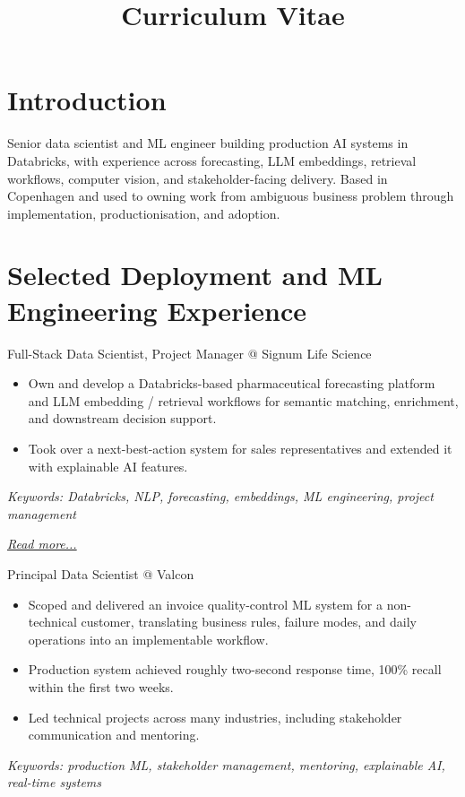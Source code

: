 \documentclass[11pt,a4paper]{moderncv}
\title{Curriculum Vitae}
\begin{document}
\makecvtitle

\section*{Introduction}
Senior data scientist and ML engineer building production AI systems in Databricks, with experience across forecasting, LLM embeddings, retrieval workflows, computer vision, and stakeholder-facing delivery. Based in Copenhagen and used to owning work from ambiguous business problem through implementation, productionisation, and adoption.

\section{Selected Deployment and ML Engineering Experience}

\large{Full-Stack Data Scientist, Project Manager @ Signum Life Science}
\normalsize
\begin{itemize}
\item Own and develop a Databricks-based pharmaceutical forecasting platform and LLM embedding / retrieval workflows for semantic matching, enrichment, and downstream decision support.
\item Took over a next-best-action system for sales representatives and extended it with explainable AI features.
\end{itemize}

{\footnotesize\textit{Keywords: Databricks, NLP, forecasting, embeddings, ML engineering, project management}}

\hfill{\small{\textit{\hyperref[sec:signum]{Read more...}}}}

\large{Principal Data Scientist @ Valcon}
\normalsize
\begin{itemize}
    \item Scoped and delivered an invoice quality-control ML system for a non-technical customer, translating business rules, failure modes, and daily operations into an implementable workflow.
    \item Production system achieved roughly two-second response time, 100\% recall within the first two weeks.
    \item Led technical projects across many industries, including stakeholder communication and mentoring.
\end{itemize}

{\footnotesize\textit{Keywords: production ML, stakeholder management, mentoring, explainable AI, real-time systems}}
\end{document}
